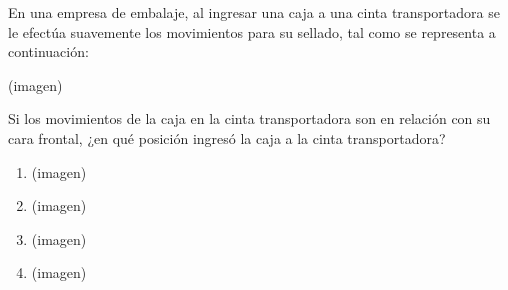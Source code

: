 \begin{problem}
    En una empresa de embalaje, al ingresar una caja a una cinta transportadora se le efectúa suavemente los movimientos para su sellado, tal como se representa a continuación:

    \begin{center}
    (imagen)
    \end{center}

    Si los movimientos de la caja en la cinta transportadora son en relación con su cara frontal, ¿en qué posición ingresó la caja a la cinta transportadora?

    \begin{enumerate}[label=\Alph*.]
        \item (imagen)
        \item (imagen)
        \item (imagen)
        \item (imagen)
    \end{enumerate}
\end{problem}
